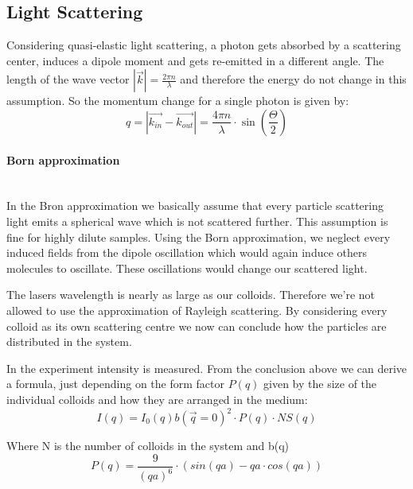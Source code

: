 \documentclass[]{article}
\begin{document}
\subsection{Light Scattering}
Considering quasi-elastic light scattering, a photon gets absorbed by a scattering center, induces a dipole moment and gets re-emitted in a different angle. The length of the wave vector $ |\vec{k}| = \frac{2\pi n}{\lambda}$ and therefore the energy do not change in this assumption. So the momentum change for a single photon is given by:
\begin{equation}\label{eq:momentum}
q= |\vec{k_{in}} - \vec{k_{out}}| = \frac{4\pi n}{\lambda} \cdot \sin \left( \dfrac{\Theta}{2} \right)  
\end{equation}

\paragraph{Born approximation}\mbox{}\\
In the Bron approximation we basically assume that every particle scattering light emits a spherical wave which is not scattered further. This assumption is fine for highly dilute samples.
Using the Born approximation, we neglect every induced fields from the dipole oscillation which would again induce others molecules to oscillate. These oscillations would change our scattered light.%

The lasers wavelength is nearly as large as our colloids. Therefore we're not allowed to use the approximation of Rayleigh scattering. By considering every colloid as its own scattering centre we now can conclude how the particles are distributed in the system.

In the experiment intensity is measured. From the conclusion above we can derive a formula, just depending on the form factor $P(q)$ given by the size of the individual colloids and how they are arranged in the medium:
\begin{equation} \label{eq:intensity}
I(q) = I_0(q)b(\vec{q}=0)^2 \cdot P(q) \cdot NS(q)
\end{equation}

Where N is the number of colloids in the system and b(q) 
\\

\begin{equation}\label{eq:form}
P(q)= \frac{9}{(qa)^6} \cdot (sin(qa) - qa \cdot cos(qa))
\end{equation}
\end{document}
